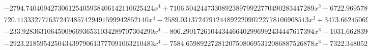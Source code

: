 \documentclass{article}
\begin{document}
\begin{landscape}
\begin{eqnarray*}
\begin{array}{cc}
\begin{array}{cc}
 -2794.740409427306125405938406142110625424 x^4+7106.504244733089238979922770490283447289 x^3-6722.969578936343946102612540172325505402 x^2+2803.669515309621801726090449286012548904 x-434.8074768092428279919235848385060615877 & x\geq \frac{1}{2}\land x<\frac{3}{4} \\
 720.4133327776372474857429491599942852140 x^4-2589.031372479124489222090722778106908513 x^3+3473.662450693899741129886499697425210336 x^2-2061.884115060975004536472627700506835989 x+456.8397040685625051429339016211942489516 & x\geq \frac{3}{4}\land x<1 \\
 -233.9283631064500966936531034289707304290 x^4-806.2901726104434466402996992434447617394 x^3-1031.662839057488773146080010993893846227 x^2-580.1686127094475931458733379733363289519 x-120.8675831559521699464399227939165140352 & x\geq -1\land x<-\frac{3}{4} \\
 -2923.218595425043439790613777091063210483 x^4-7584.659892272812075080695312086887526878 x^3-7322.348052183552208152117816109825684339 x^2-3115.874797505921951637883585778705480041 x-492.8532772829040967835705292876626861895 & x\geq -\frac{3}{4}\land x<-\frac{1}{2}
\end{array}

\end{array}\end{eqnarray*}
\end{landscape}
\end{document}
